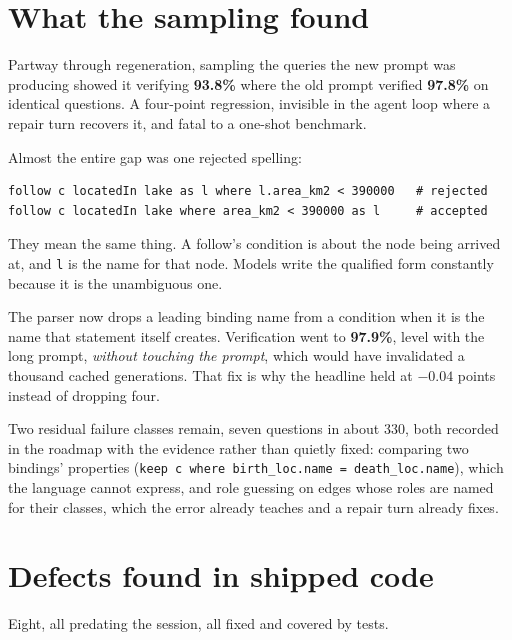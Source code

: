 \documentclass[11pt]{article}
\begin{document}
\section{What the sampling found}
\label{sec:sampling}

Partway through regeneration, sampling the queries the new prompt was producing
showed it verifying \textbf{93.8\%} where the old prompt verified \textbf{97.8\%}
on identical questions. A four-point regression, invisible in the agent loop
where a repair turn recovers it, and fatal to a one-shot benchmark.

Almost the entire gap was one rejected spelling:

\begin{lstlisting}[style=err]
follow c locatedIn lake as l where l.area_km2 < 390000   # rejected
follow c locatedIn lake where area_km2 < 390000 as l     # accepted
\end{lstlisting}

They mean the same thing. A follow's condition is about the node being arrived
at, and \texttt{l} is the name for that node. Models write the qualified form
constantly because it is the unambiguous one.

The parser now drops a leading binding name from a condition when it is the name
that statement itself creates. Verification went to \textbf{97.9\%}, level with
the long prompt, \emph{without touching the prompt}, which would have invalidated
a thousand cached generations. That fix is why the headline held at $-0.04$
points instead of dropping four.

Two residual failure classes remain, seven questions in about 330, both recorded
in the roadmap with the evidence rather than quietly fixed: comparing two
bindings' properties (\texttt{keep c where birth\_loc.name = death\_loc.name}),
which the language cannot express, and role guessing on edges whose roles are
named for their classes, which the error already teaches and a repair turn
already fixes.

\section{Defects found in shipped code}

Eight, all predating the session, all fixed and covered by tests.
\end{document}
